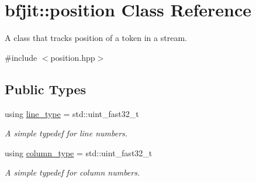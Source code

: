 \hypertarget{classbfjit_1_1position}{}\section{bfjit\+:\+:position Class Reference}
\label{classbfjit_1_1position}


A class that tracks position of a token in a stream.  




{\ttfamily \#include $<$position.\+hpp$>$}

\subsection*{Public Types}
\begin{DoxyCompactItemize}
\item 
\hypertarget{classbfjit_1_1position_a6319989e5821e4a159ed1870e8ba656e}{}\label{classbfjit_1_1position_a6319989e5821e4a159ed1870e8ba656e} 
using \hyperlink{classbfjit_1_1position_a6319989e5821e4a159ed1870e8ba656e}{line\+\_\+type} = std\+::uint\+\_\+fast32\+\_\+t
\begin{DoxyCompactList}\small\item\em A simple typedef for line numbers. \end{DoxyCompactList}\item 
\hypertarget{classbfjit_1_1position_a472af3de5d41775deff6293c0ab6450b}{}\label{classbfjit_1_1position_a472af3de5d41775deff6293c0ab6450b} 
using \hyperlink{classbfjit_1_1position_a472af3de5d41775deff6293c0ab6450b}{column\+\_\+type} = std\+::uint\+\_\+fast32\+\_\+t
\begin{DoxyCompactList}\small\item\em A simple typedef for column numbers. \end{DoxyCompactList}\end{DoxyCompactItemize}
